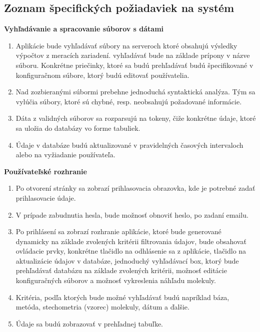 \documentclass[12pt,a4paper]{article}
\begin{document}
\subsection{Zoznam špecifických požiadaviek na systém}
\begin{enumerate}[label={[\arabic*]}]
	\item {\bf Vyhľadávanie a spracovanie súborov s dátami} 
	\begin{enumerate}
		\item Aplikácie bude vyhľadávať súbory na serveroch ktoré obsahujú výsledky výpočtov z meracích zariadení. vyhľadávať bude na základe prípony v názve súboru. Konkrétne priečinky, ktoré sa budú prehľadávať budú špecifikované v konfiguračnom súbore, ktorý budú editovať používatelia.
		\item Nad zozbieranými súbormi prebehne jednoduchá syntaktická analýza. Tým sa vylúčia súbory, ktoré sú chybné, resp. neobsahujú požadované informácie.
		\item Dáta z validných súborov sa rozparsujú na tokeny, čiže konkrétne údaje, ktoré sa uložia do databázy vo forme tabuliek.
		\item Údaje v databáze budú aktualizované v pravidelných časových intervaloch alebo na vyžiadanie používateľa.
	\end{enumerate}
	\item {\bf Používateľské rozhranie} 
	\begin{enumerate}
		\item Po otvorení stránky sa zobrazí prihlasovacia obrazovka, kde je potrebné zadať prihlasovacie údaje.
		\item V prípade zabudnutia hesla, bude možnosť obnoviť heslo, po zadaní emailu.
		\item Po prihlásení sa zobrazí rozhranie aplikácie, ktoré bude generované dynamicky na základe zvolených kritérii filtrovania údajov, bude obsahovať ovládacie prvky, konkrétne tlačidlo na odhlásenie sa z aplikácie, tlačidlo na aktualizácie údajov v databáze, jednoduchý vyhľadávací box, ktorý bude prehľadávať databázu na základe zvolených kritérii, možnosť editácie konfiguračných súborov a možnosť vykreslenia náhľadu molekuly.
		\item Kritéria, podľa ktorých bude možné vyhľadávať budú napríklad báza, metóda, stechometria (vzorec) molekuly, dátum a ďalšie.
		\item Údaje sa budú zobrazovať v prehľadnej tabuľke.
	\end{enumerate}
\end{enumerate}
\end{document}
